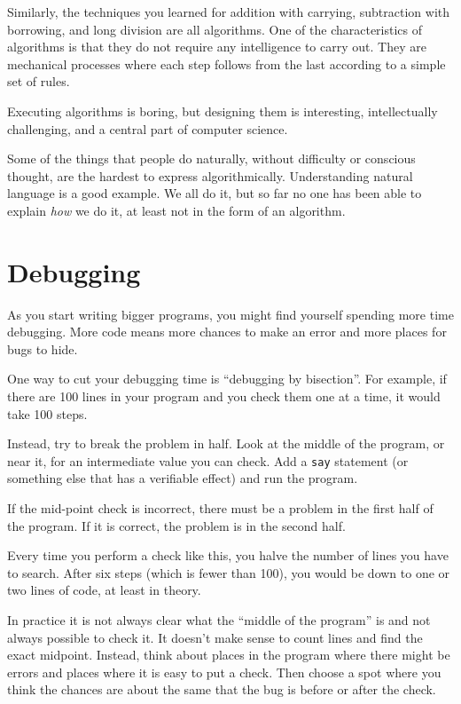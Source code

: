 Similarly, the techniques you learned for addition with carrying,
subtraction with borrowing, and long division are all algorithms.  One
of the characteristics of algorithms is that they do not require any
intelligence to carry out.  They are mechanical processes where
each step follows from the last according to a simple set of rules.

Executing algorithms is boring, but designing them is interesting,
intellectually challenging, and a central part of computer science.

Some of the things that people do naturally, without difficulty or
conscious thought, are the hardest to express algorithmically.
Understanding natural language is a good example.  We all do it, but
so far no one has been able to explain {\em how} we do it, at least
not in the form of an algorithm.


\section{Debugging}
\label{bisectbug}

As you start writing bigger programs, you might find yourself
spending more time debugging.  More code means more chances to
make an error and more places for bugs to hide.

One way to cut your debugging time is ``debugging by bisection''.
For example, if there are 100 lines in your program and you
check them one at a time, it would take 100 steps.

Instead, try to break the problem in half.  Look at the middle
of the program, or near it, for an intermediate value you
can check.  Add a {\tt say} statement (or something else
that has a verifiable effect) and run the program.

If the mid-point check is incorrect, there must be a problem in the
first half of the program.  If it is correct, the problem is
in the second half.

Every time you perform a check like this, you halve the number of
lines you have to search.  After six steps (which is fewer than 100),
you would be down to one or two lines of code, at least in theory.

In practice it is not always clear what
the ``middle of the program'' is and not always possible to
check it.  It doesn't make sense to count lines and find the
exact midpoint.  Instead, think about places
in the program where there might be errors and places where it
is easy to put a check.  Then choose a spot where you
think the chances are about the same that the bug is before
or after the check.


